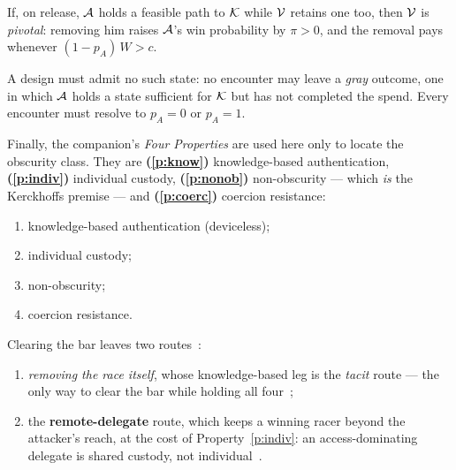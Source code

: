 \begin{lemma}\label{lem:drl}
If, on release, $\mathcal{A}$ holds a feasible path to $\mathcal{K}$ while $\mathcal{V}$
retains one too, then $\mathcal{V}$ is \emph{pivotal}: removing him raises
$\mathcal{A}$'s win probability by $\pi > 0$, and the removal pays whenever
$(1-p_A)\,W > c$.
\end{lemma}

\begin{criterion}\label{prin:nga}
A design must admit no such state: no encounter may leave a \emph{gray} outcome,
one in which $\mathcal{A}$ holds a state sufficient for $\mathcal{K}$ but has not
completed the spend. Every encounter must resolve to $p_A = 0$ or $p_A = 1$.
\end{criterion}

\noindent Finally, the companion's \emph{Four Properties} are used here only to
locate the obscurity class. They are \textbf{(\ref{p:know})} knowledge-based
authentication, \textbf{(\ref{p:indiv})} individual custody,
\textbf{(\ref{p:nonob})} non-obscurity --- which \emph{is} the Kerckhoffs premise
--- and \textbf{(\ref{p:coerc})} coercion resistance:
\begin{enumerate}[nosep,leftmargin=2.4em,label=\textbf{(\arabic*)},ref=\arabic*]
  \item\label{p:know} knowledge-based authentication (deviceless);
  \item\label{p:indiv} individual custody;
  \item\label{p:nonob} non-obscurity;
  \item\label{p:coerc} coercion resistance.
\end{enumerate}
Clearing the bar leaves two routes~\cite[Cor.~2]{deadly-race}:
\begin{enumerate}[nosep,leftmargin=2.9em,label=\textbf{(R\arabic*)},ref=R\arabic*]
  \item\label{r:removerace} \emph{removing the race itself}, whose
        knowledge-based leg is the \emph{tacit} route --- the only way to clear
        the bar while holding all four~\cite[Cor.~3]{deadly-race};
  \item\label{r:remotewinner} the \textbf{remote-delegate} route, which keeps a
        winning racer beyond the attacker's reach, at the cost of
        Property~\ref{p:indiv}: an access-dominating delegate is shared custody,
        not individual~\cite[Cor.~3]{deadly-race}.
\end{enumerate}
